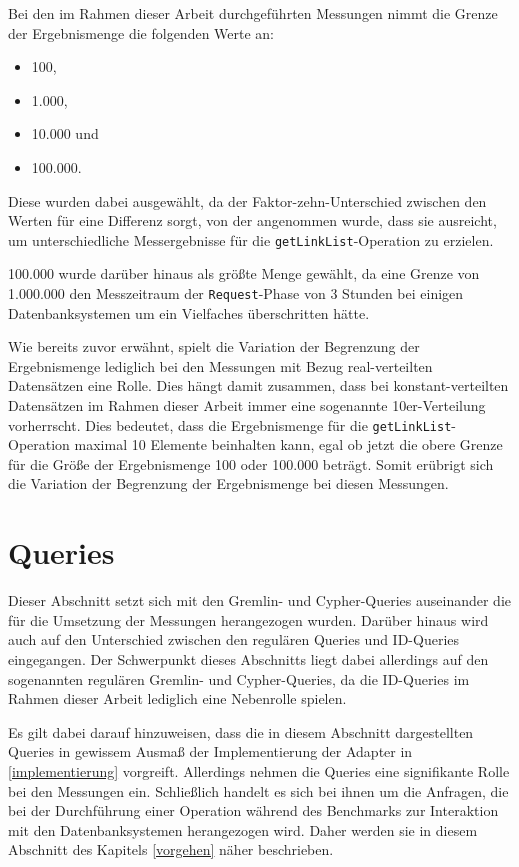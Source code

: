 Bei den im Rahmen dieser Arbeit durchgeführten Messungen nimmt die Grenze der Ergebnismenge die folgenden Werte an:
\begin{itemize}
    \item 100,
    \item 1.000,
    \item 10.000 und
    \item 100.000. 
\end{itemize}
Diese wurden dabei ausgewählt, da der Faktor-zehn-Unterschied zwischen den Werten für eine Differenz sorgt, von der angenommen wurde, dass sie ausreicht, um unterschiedliche Messergebnisse für die \texttt{getLinkList}-Operation zu erzielen. 

100.000 wurde darüber hinaus als größte Menge gewählt, da eine Grenze von 1.000.000 den Messzeitraum der \texttt{Request}-Phase von 3 Stunden bei einigen Datenbanksystemen um ein Vielfaches überschritten hätte.

Wie bereits zuvor erwähnt, spielt die Variation der Begrenzung der Ergebnismenge lediglich bei den Messungen mit Bezug real-verteilten Datensätzen eine Rolle. Dies hängt damit zusammen, dass bei konstant-verteilten Datensätzen im Rahmen dieser Arbeit immer eine sogenannte 10er-Verteilung vorherrscht. Dies bedeutet, dass die Ergebnismenge für die \texttt{getLinkList}-Operation maximal 10 Elemente beinhalten kann, egal ob jetzt die obere Grenze für die Größe der Ergebnismenge 100 oder 100.000 beträgt. Somit erübrigt sich die Variation der Begrenzung der Ergebnismenge bei diesen Messungen. 

\section{Queries}
\label{analyse:queries}
Dieser Abschnitt setzt sich mit den Gremlin- und Cypher-Queries auseinander die für die Umsetzung der Messungen herangezogen wurden. Darüber hinaus wird auch auf den Unterschied zwischen den regulären Queries und ID-Queries eingegangen. Der Schwerpunkt dieses Abschnitts liegt dabei allerdings auf den sogenannten regulären Gremlin- und Cypher-Queries, da die ID-Queries im Rahmen dieser Arbeit lediglich eine Nebenrolle spielen. 

Es gilt dabei darauf hinzuweisen, dass die in diesem Abschnitt dargestellten Queries in gewissem Ausmaß der Implementierung der Adapter in \autoref{implementierung} vorgreift. Allerdings nehmen die Queries eine signifikante Rolle bei den Messungen ein. Schließlich handelt es sich bei ihnen um die Anfragen, die bei der Durchführung einer Operation während des Benchmarks zur Interaktion mit den Datenbanksystemen herangezogen wird. Daher werden sie in diesem Abschnitt des Kapitels \autoref{vorgehen} näher beschrieben.

